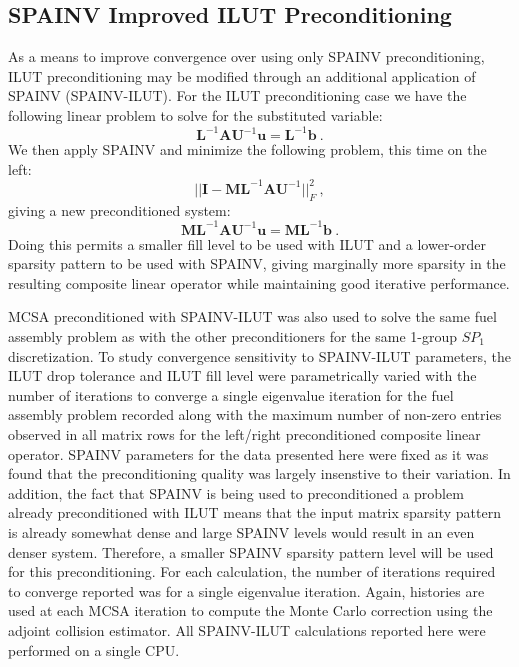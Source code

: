 \subsection{SPAINV Improved ILUT Preconditioning}
\label{subsec:spn_spainv_preconditioning}
As a means to improve convergence over using only SPAINV
preconditioning, ILUT preconditioning may be modified through an
additional application of SPAINV
(SPAINV-ILUT)\citep{saad_iterative_2003}. For the ILUT preconditioning
case we have the following linear problem to solve for the substituted
variable:
\begin{equation}
  \mathbf{L}^{-1} \mathbf{A} \mathbf{U}^{-1} \mathbf{u} =
  \mathbf{L}^{-1} \mathbf{b}\:.
  \label{eq:ilut_standalone}
\end{equation}
We then apply SPAINV and minimize the following problem, this time on
the left:
\begin{equation}
  || \mathbf{I} - \mathbf{M} \mathbf{L}^{-1} \mathbf{A}
  \mathbf{U}^{-1} ||^2_F\:,
  \label{eq:ilut_minimize}
\end{equation}
giving a new preconditioned system:
\begin{equation}
  \mathbf{M} \mathbf{L}^{-1} \mathbf{A} \mathbf{U}^{-1} \mathbf{u} =
  \mathbf{M} \mathbf{L}^{-1} \mathbf{b}\:.
  \label{eq:ilut_spainv}
\end{equation}
Doing this permits a smaller fill level to be used with ILUT and a
lower-order sparsity pattern to be used with SPAINV, giving marginally
more sparsity in the resulting composite linear operator while
maintaining good iterative performance.

MCSA preconditioned with SPAINV-ILUT was also used to solve the same
fuel assembly problem as with the other preconditioners for the same
1-group $SP_1$ discretization. To study convergence sensitivity to
SPAINV-ILUT parameters, the ILUT drop tolerance and ILUT fill level
were parametrically varied with the number of iterations to converge a
single eigenvalue iteration for the fuel assembly problem recorded
along with the maximum number of non-zero entries observed in all
matrix rows for the left/right preconditioned composite linear
operator. SPAINV parameters for the data presented here were fixed as
it was found that the preconditioning quality was largely insenstive
to their variation. In addition, the fact that SPAINV is being used to
preconditioned a problem already preconditioned with ILUT means that
the input matrix sparsity pattern is already somewhat dense and large
SPAINV levels would result in an even denser system. Therefore, a
smaller SPAINV sparsity pattern level will be used for this
preconditioning. For each calculation, the number of iterations
required to converge reported was for a single eigenvalue iteration.
Again,  histories are used at each MCSA iteration to compute
the Monte Carlo correction using the adjoint collision estimator. All
SPAINV-ILUT calculations reported here were performed on a single CPU.

